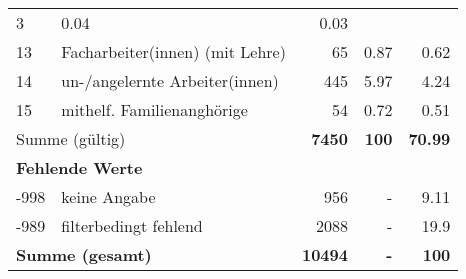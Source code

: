 \begin{longtable}{lXrrr}
       \num{3} &
       \num[round-mode=places,round-precision=2]{0,04} &
         \num[round-mode=places,round-precision=2]{0,03} \\

     13 &
     \multicolumn{1}{X}{ Facharbeiter(innen) (mit Lehre)   } &


       \num{65} &
       \num[round-mode=places,round-precision=2]{0,87} &
         \num[round-mode=places,round-precision=2]{0,62} \\

     14 &
     \multicolumn{1}{X}{ un-/angelernte Arbeiter(innen)   } &


       \num{445} &
       \num[round-mode=places,round-precision=2]{5,97} &
         \num[round-mode=places,round-precision=2]{4,24} \\

     15 &
     \multicolumn{1}{X}{ mithelf. Familienanghörige   } &


       \num{54} &
       \num[round-mode=places,round-precision=2]{0,72} &
         \num[round-mode=places,round-precision=2]{0,51} \\
     \midrule
     \multicolumn{2}{l}{Summe (gültig)} &
       \textbf{\num{7450}} &
     \textbf{100} &
       \textbf{\num[round-mode=places,round-precision=2]{70,99}} \\
     \multicolumn{5}{l}{\textbf{Fehlende Werte}}\\
       -998 &
       keine Angabe &
         \num{956} &
        - &
         \num[round-mode=places,round-precision=2]{9,11} \\
       -989 &
       filterbedingt fehlend &
         \num{2088} &
        - &
         \num[round-mode=places,round-precision=2]{19,9} \\
     \midrule
     \multicolumn{2}{l}{\textbf{Summe (gesamt)}} &
          \textbf{\num{10494}} &
        \textbf{-} &
        \textbf{100} \\
     \bottomrule
     \end{longtable}
     
